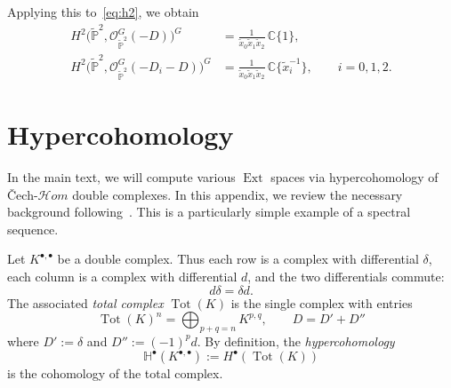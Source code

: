 \documentclass[dvipsnames,11pt]{article}
\theoremstyle{definition}
\newtheorem{remark}[theorem]{Remark}
\newcommand{\cO}{\mathcal{O}}
\newcommand{\C}{{\mathbb C}}
\renewcommand{\P}{{\mathbb P}}
\newcommand{\bP}{{\mathbb P}}
\def\Ext{\operatorname{Ext}}
\def\tot{\operatorname{Tot}}
\newcommand{\oH}{{H}}
\def\Ext{\operatorname{Ext}}
\begin{document}
\begin{appendices}
Applying this to~\eqref{eq:h2}, we obtain
\begin{align}
H^2\bigl(\widetilde{\P}^2,\mathcal O^G_{\widetilde{\P}^2}(-D)\bigr)^G
&=
\frac{1}{\widetilde x_0\widetilde x_1\widetilde x_2}\,\C\{1\},
\nonumber\\
H^2\bigl(\widetilde{\P}^2,\mathcal O^G_{\widetilde{\P}^2}(-D_i-D)\bigr)^G
&=
\frac{1}{\widetilde x_0\widetilde x_1\widetilde x_2}\,\C\{\widetilde x_i^{-1}\}, \qquad i=0,1,2.
\label{eq:h2G}
\end{align}

\section{Hypercohomology} \label{app:ss}

In the main text, we will compute various $\Ext$ spaces via hypercohomology of \v Cech-$\mathcal Hom$ double complexes. In this appendix, we review the necessary background following~\cite[Chapter~II]{BT}. This is a particularly simple example of a spectral sequence.

Let $K^{\bullet,\bullet}$ be a double complex. Thus each row is a complex with differential $\delta$, each column is a complex with differential $d$, and the two differentials commute:
\[
d \delta = \delta d.
\]
The associated \emph{total complex} $\tot(K)$ is the single complex with entries
\[
\tot(K)^n = \bigoplus_{p+q=n} K^{p,q}, \qquad D = D'+D''
\]
where $D' := \delta$ and $D'' := (-1)^p d$. By definition, the \emph{hypercohomology} 
\[
\mathbb H^\bullet(K^{\bullet,\bullet}) := H^\bullet(\tot(K))
\]
is the cohomology of the total complex.





\end{appendices}
\end{document}
